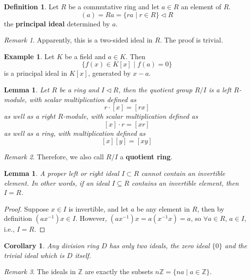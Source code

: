 \documentclass[12pt, a4paper, titlepage]{report}
\theoremstyle{plain} %
\newtheorem{lem}[thm]{Lemma}
\newtheorem{cor}[thm]{Corollary}
\theoremstyle{definition}
\newtheorem{defn}{Definition}[section]
\newtheorem{exmp}{Example}[section]
\theoremstyle{remark}
\newtheorem*{rem}{Remark}
\begin{document}
\begin{defn}
  Let $R$ be a commutative ring and let $a \in R$ an element of $R$.
  \[
    (a) = Ra = \{ ra \mid r \in R \} \lhd R
  \]
  the \textbf{principal ideal} determined by $a$.
\end{defn}

\begin{rem}
  Apparently, this is a two-sided ideal in $R$. The proof is trivial.
\end{rem}

\begin{exmp}
  Let $K$ be a field and $a \in K$. Then
  \[
    \{ f(x) \in K[x] \mid f(a) = 0 \}
  \]
  is a principal ideal in $K[x]$, generated by $x - a$.
\end{exmp}

\begin{lem}
  Let $R$ be a ring and $I \lhd R$, then the quotient group $R/I$ is a left $R$-module, with
  scalar multiplication defined as
  \[
    r \cdot [x] = [rx]
  \]
  as well as a right $R$-module, with scalar multiplication defined as
  \[
    [x] \cdot r = [xr]
  \]
  as well as a ring, with multiplication defined as
  \[
    [x][y] = [xy]
  \]
\end{lem}

\begin{rem}
  Therefore, we also call $R/I$ a \textbf{quotient ring}.
\end{rem}

\begin{lem}
  A proper left or right ideal $I \subset R$ cannot contain an invertible element. In other words, if
  an ideal $I \subseteq R$ contains an invertible element, then $I = R$.
\end{lem}

\begin{proof}
  Suppose $x \in I$ is invertible, and let $a$ be any element in $R$, then by definition $(ax^{-1})x \in I$.
  However, $(ax^{-1})x = a(x^{-1}x) = a$, so $\forall a \in R$, $a \in I$, i.e., $I = R$.
\end{proof}

\begin{cor}
  Any division ring $D$ has only two ideals, the zero ideal $\{0\}$ and the trivial ideal which is $D$ itself.
\end{cor}

\begin{rem}
  The ideals in $\mathbb{Z}$ are exactly the subsets $n\mathbb{Z} = \{ na \mid a \in \mathbb{Z} \}$.
\end{rem}
\end{document}
